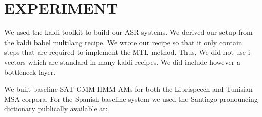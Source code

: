 \section{EXPERIMENT}
\label{sec-4}

We used the kaldi toolkit\cite{Povey11thekaldi} to build our ASR systems. 
We derived our setup from the kaldi babel multilang recipe. 
We  wrote our recipe so that  it only contain  steps that are required to implement the \gls{MTL} method. 
Thus, We did not use i-vectors which are standard in many kaldi recipes. 
We did include however a bottleneck layer. 

We built baseline \gls{SAT} \gls{GMM} \gls{HMM} \gls{AM}s for both the Librispeech and Tunisian \gls{MSA} corpora.
For the Spanish baseline system we  used  the Santiago  pronouncing dictionary publically available at:

